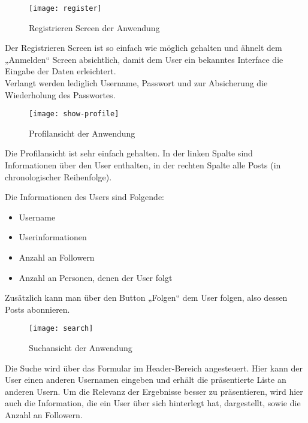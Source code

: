 \newpage
    \begin{figure}[!htb]
      \begin{center}
          \texttt{[image: register]}
        \caption{Registrieren Screen der Anwendung}
        \label{fig:register}
      \end{center}
    \end{figure}

    Der Registrieren Screen ist so einfach wie möglich gehalten und ähnelt dem „Anmelden“ Screen absichtlich, damit dem User ein bekanntes Interface die Eingabe der Daten erleichtert. \\
    Verlangt werden lediglich Username, Passwort und zur Absicherung die Wiederholung des Passwortes.

\newpage
    \begin{figure}[!htb]
      \begin{center}
          \texttt{[image: show-profile]}
        \caption{Profilansicht der Anwendung}
        \label{fig:show-profile}
      \end{center}
    \end{figure}

    Die Profilansicht ist sehr einfach gehalten. In der linken Spalte sind Informationen über den User enthalten, in der rechten Spalte alle Posts (in chronologischer Reihenfolge).

    Die Informationen des Users sind Folgende:
    \begin{itemize}
      \item Username
      \item Userinformationen
      \item Anzahl an Followern
      \item Anzahl an Personen, denen der User folgt
    \end{itemize}

    Zusätzlich kann man über den Button „Folgen“ dem User folgen, also dessen Posts abonnieren.

\newpage
    \begin{figure}[!htb]
      \begin{center}
          \texttt{[image: search]}
        \caption{Suchansicht der Anwendung}
        \label{fig:search}
      \end{center}
    \end{figure}

    Die Suche wird über das Formular im Header-Bereich angesteuert. Hier kann der User einen anderen Usernamen eingeben und erhält die präsentierte Liste an anderen Usern. Um die Relevanz der Ergebnisse besser zu präsentieren, wird hier auch die Information, die ein User über sich hinterlegt hat, dargestellt, sowie die Anzahl an Followern.

